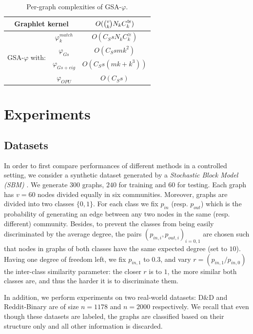 \documentclass{article}
\begin{document}
\begin{table}
\centering
\begin{tabular}{|c|c|c|}
\hline
\multicolumn{2}{|c|}{Graphlet kernel} & $O(\tbinom{v}{k} N_k C^{\cong}_k)$\\ \hline \hline
%
\multirow{4}{*}{GSA-$\varphi$ with:} & $\varphi^{match}_k$ & $O(C_S s N_k C^{\cong}_k)$ \\
& $\varphi_{Gs}$ & $O(C_S s m k^2)$ \\ 
& $\varphi_{Gs+eig}$  & $O(C_S s (m k + k^3))$ \\ 
& $\varphi_{OPU}$  & $O(C_S s)$ \\ \hline
\end{tabular}
\caption{Per-graph complexities of GSA-$\varphi$.}
\label{tab:cost}
\end{table}


\section{Experiments}\label{sec:experiments}
\subsection{Datasets}\label{sec:setup}
%
In order to first compare performances of different methods in a controlled setting, we consider a synthetic dataset generated by a \emph{Stochastic Block Model (SBM)} \cite{SBM}. We generate $300$ graphs, $240$ for training  and $60$ for testing. Each graph has $v=60$ nodes divided equally in six communities. Moreover, graphs are divided into two classes $\{0 , 1\}$. For each class we fix $p_{in}$ (resp. $p_{out}$) which is the probability of generating an edge between any two nodes in the same (resp. different) community. Besides, to prevent the classes from being easily discriminated by the average degree, the pairs $(p_{in,i} , p_{out,i})_{i=0,1}$ are chosen such that nodes in graphs of both classes have the same expected degree (set to $10$). Having one degree of freedom left, we fix $p_{in,1}$ to $0.3$, and vary $r=(p_{in,1}/p_{in,0})$ the inter-class similarity parameter: the closer $r$ is to $1$, the more similar both classes are, and thus the harder it is to discriminate them.

In addition, we perform experiments on two real-world datasets: D\&D \cite{DD_ref} and Reddit-Binary \cite{class_Reddit} are of size $n=1178$ and  $n=2000$ respectively. We recall that even though these datasets are labeled, the graphs are classified based on their structure only and all other information is discarded.
\end{document}

